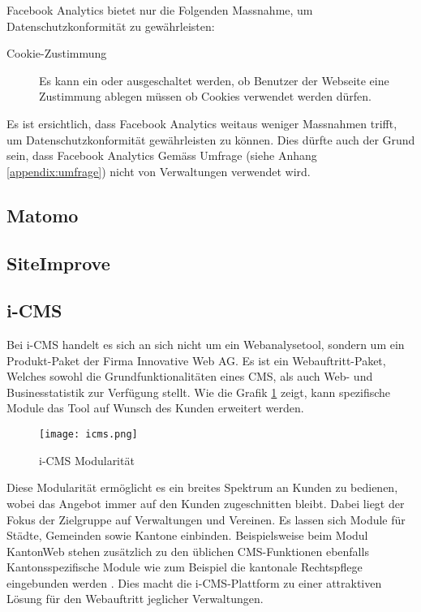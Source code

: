 Facebook Analytics bietet nur die Folgenden Massnahme, um Datenschutzkonformität zu gewährleisten: 

\begin{description}
  \item[Cookie-Zustimmung] Es kann ein oder ausgeschaltet werden, ob Benutzer der Webseite eine Zustimmung ablegen müssen ob Cookies verwendet werden dürfen.
\end{description}

Es ist ersichtlich, dass Facebook Analytics weitaus weniger Massnahmen trifft, um Datenschutzkonformität gewährleisten zu können. Dies dürfte auch der Grund sein, dass Facebook Analytics Gemäss Umfrage (siehe Anhang \ref{appendix:umfrage}) nicht von Verwaltungen verwendet wird.

\subsection{Matomo}

\subsection{SiteImprove}

\subsection{i-CMS}
Bei i-CMS handelt es sich an sich nicht um ein Webanalysetool, sondern um ein Produkt-Paket der Firma Innovative Web AG. Es ist ein Webauftritt-Paket, Welches sowohl die Grundfunktionalitäten eines CMS, als auch Web- und Businesstatistik zur Verfügung stellt\parencite{iwebwebsiteCMS}. Wie die Grafik \ref{fig: icms} zeigt, kann spezifische Module das Tool auf Wunsch des Kunden erweitert werden.


\begin{figure}[h]
  \centering
  \texttt{[image: icms.png]}
  \caption{i-CMS Modularität \parencite{iweb2019revue}}
  \label{fig: icms}
\end{figure}

Diese Modularität ermöglicht es ein breites Spektrum an Kunden zu bedienen, wobei das Angebot immer auf den Kunden zugeschnitten bleibt. Dabei liegt der Fokus der Zielgruppe auf Verwaltungen und Vereinen. Es lassen sich Module für Städte, Gemeinden sowie Kantone einbinden. Beispielsweise beim Modul KantonWeb stehen zusätzlich zu den üblichen CMS-Funktionen ebenfalls Kantonsspezifische Module wie zum Beispiel die kantonale Rechtspflege eingebunden werden \parencite{iwebwebsiteKanotonWeb}. Dies macht die i-CMS-Plattform zu einer attraktiven Lösung für den Webauftritt jeglicher Verwaltungen. 

